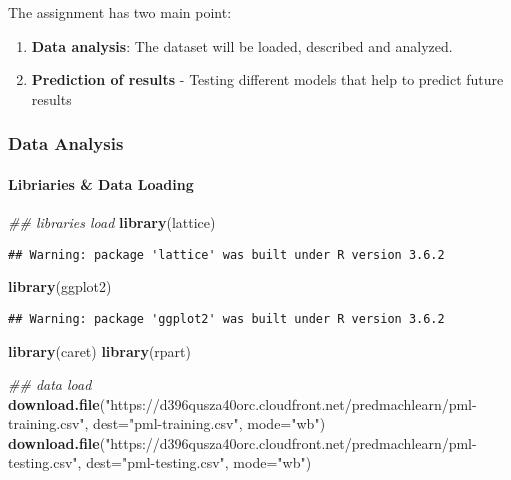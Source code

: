 \documentclass[]{article}
\newenvironment{Shaded}{\begin{snugshade}}{\end{snugshade}}
\newcommand{\CommentTok}[1]{\textcolor[rgb]{0.56,0.35,0.01}{\textit{#1}}}
\newcommand{\DataTypeTok}[1]{\textcolor[rgb]{0.13,0.29,0.53}{#1}}
\newcommand{\KeywordTok}[1]{\textcolor[rgb]{0.13,0.29,0.53}{\textbf{#1}}}
\newcommand{\NormalTok}[1]{#1}
\newcommand{\StringTok}[1]{\textcolor[rgb]{0.31,0.60,0.02}{#1}}
\let\oldparagraph\paragraph
\renewcommand{\paragraph}[1]{\oldparagraph{#1}\mbox{}}
\begin{document}
The assignment has two main point:

\begin{enumerate}
\def\labelenumi{\arabic{enumi}.}
\item
  \textbf{Data analysis}: The dataset will be loaded, described and
  analyzed.
\item
  \textbf{Prediction of results} - Testing different models that help to
  predict future results
\end{enumerate}

\hypertarget{data-analysis}{%
\subsubsection{Data Analysis}\label{data-analysis}}

\hypertarget{libriaries-data-loading}{%
\paragraph{Libriaries \& Data Loading}\label{libriaries-data-loading}}

\begin{Shaded}
\begin{Highlighting}[]
\CommentTok{## libraries load}
\KeywordTok{library}\NormalTok{(lattice)}
\end{Highlighting}
\end{Shaded}

\begin{verbatim}
## Warning: package 'lattice' was built under R version 3.6.2
\end{verbatim}

\begin{Shaded}
\begin{Highlighting}[]
\KeywordTok{library}\NormalTok{(ggplot2)}
\end{Highlighting}
\end{Shaded}

\begin{verbatim}
## Warning: package 'ggplot2' was built under R version 3.6.2
\end{verbatim}

\begin{Shaded}
\begin{Highlighting}[]
\KeywordTok{library}\NormalTok{(caret)}
\KeywordTok{library}\NormalTok{(rpart)}
\end{Highlighting}
\end{Shaded}

\begin{Shaded}
\begin{Highlighting}[]
\CommentTok{## data load}
\KeywordTok{download.file}\NormalTok{(}\StringTok{"https://d396qusza40orc.cloudfront.net/predmachlearn/pml-training.csv"}\NormalTok{, }\DataTypeTok{dest=}\StringTok{"pml-training.csv"}\NormalTok{, }\DataTypeTok{mode=}\StringTok{"wb"}\NormalTok{)}
\KeywordTok{download.file}\NormalTok{(}\StringTok{"https://d396qusza40orc.cloudfront.net/predmachlearn/pml-testing.csv"}\NormalTok{, }\DataTypeTok{dest=}\StringTok{"pml-testing.csv"}\NormalTok{, }\DataTypeTok{mode=}\StringTok{"wb"}\NormalTok{)}
\end{Highlighting}
\end{Shaded}
\end{document}
